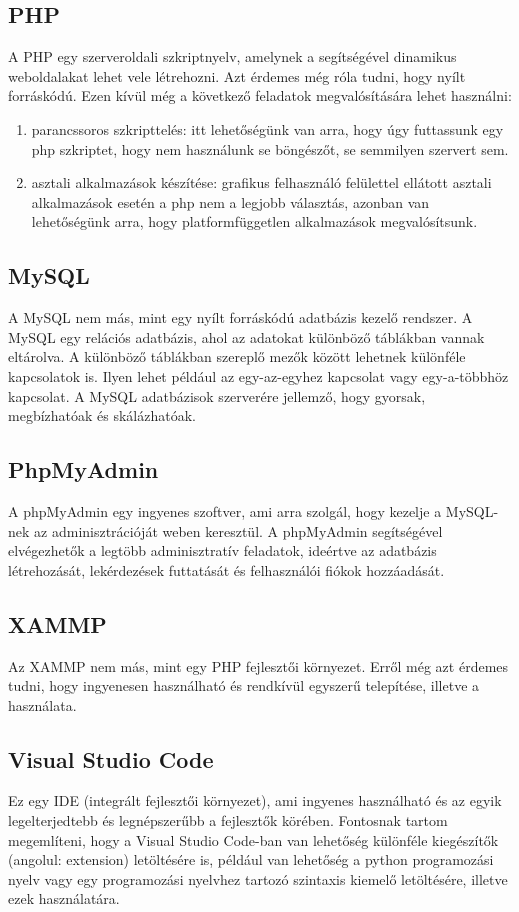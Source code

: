 \documentclass[]{thesis-ekf}
\theoremstyle{definition}
\theoremstyle{remark}
\begin{document}
	\subsection{PHP}
		A PHP egy szerveroldali szkriptnyelv, amelynek a segítségével dinamikus weboldalakat lehet vele létrehozni. Azt érdemes még róla tudni, hogy nyílt forráskódú. Ezen kívül még a következő feladatok megvalósítására lehet használni:
		\begin{enumerate}
			\item parancssoros szkripttelés: itt lehetőségünk van arra, hogy úgy futtassunk egy php szkriptet, hogy nem használunk se böngészőt, se semmilyen szervert sem.
			\item asztali alkalmazások készítése: grafikus felhasználó felülettel ellátott asztali alkalmazások esetén a php nem a legjobb választás, azonban van lehetőségünk arra, hogy platformfüggetlen alkalmazások megvalósítsunk.
		\end{enumerate}
		\cite{PHP}
	\subsection{MySQL}
		A MySQL nem más, mint egy nyílt forráskódú adatbázis kezelő rendszer. A MySQL egy relációs adatbázis, ahol az adatokat különböző táblákban vannak eltárolva. A különböző táblákban szereplő mezők között lehetnek különféle kapcsolatok is. Ilyen lehet például az egy-az-egyhez kapcsolat vagy egy-a-többhöz kapcsolat. A MySQL adatbázisok szerverére jellemző, hogy gyorsak, megbízhatóak és skálázhatóak.
		\cite{MySQL}
	\subsection{PhpMyAdmin}
		A phpMyAdmin egy ingyenes szoftver, ami arra szolgál, hogy kezelje a MySQL-nek az adminisztrációját weben keresztül. A phpMyAdmin segítségével elvégezhetők a legtöbb adminisztratív feladatok, ideértve az adatbázis létrehozását, lekérdezések futtatását és felhasználói fiókok hozzáadását.
		\cite{PhpMyAdmin}
	\subsection{XAMMP}
		Az XAMMP nem más, mint egy PHP fejlesztői környezet. Erről még azt érdemes tudni, hogy ingyenesen használható és rendkívül egyszerű telepítése, illetve a használata.
	\subsection{Visual Studio Code}
		Ez egy IDE (integrált fejlesztői környezet), ami ingyenes használható és az egyik legelterjedtebb és legnépszerűbb a fejlesztők körében. Fontosnak tartom megemlíteni, hogy a Visual Studio Code-ban van lehetőség különféle kiegészítők (angolul: extension) letöltésére is, például van lehetőség a python programozási nyelv vagy egy programozási nyelvhez tartozó szintaxis kiemelő letöltésére, illetve ezek használatára.
\end{document}
